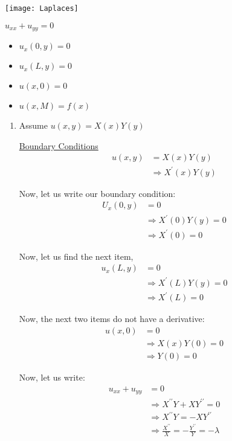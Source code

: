 \begin{center}
  \texttt{[image: Laplaces]}

  $u_{xx} + u_{yy} = 0$
\end{center}
%
\begin{itemize}
  \item $u_x(0, y) = 0$
  \item $u_x(L, y) = 0$
  \item $u(x, 0) = 0$
  \item $u(x, M) = f(x)$
\end{itemize}
%
\begin{enumerate}
  \item Assume $u(x, y) = X(x)Y(y)$

  \underline{Boundary Conditions}
  \begin{align}
    u(x, y) & = X(x) Y(y)\\
    & \Rightarrow X^\prime(x)Y(y)
  \end{align}

  Now, let us write our boundary condition:
  \begin{align}
    U_x(0, y) & = 0\\
    & \Rightarrow X^\prime(0)Y(y) = 0\\
    & \Rightarrow X^\prime(0) = 0
  \end{align}

  Now, let us find the next item,
  \begin{align}
    u_x(L, y) & = 0\\
    & \Rightarrow X^\prime(L)Y(y) = 0\\
    & \Rightarrow X^\prime(L) = 0
  \end{align}

  Now, the next two items do not have a derivative:
  \begin{align}
    u(x, 0) & = 0\\
    & \Rightarrow X(x)Y(0) = 0\\
    & \Rightarrow Y(0) = 0
  \end{align}

  Now, let us write:
  \begin{align}
    u_{xx} + u_{yy} & = 0\\
    & \Rightarrow X^{\prime\prime}Y + XY^{\prime\prime} = 0\\
    & \Rightarrow X^{\prime\prime}Y = - XY^{\prime\prime}\\
    & \Rightarrow \frac{X^{\prime\prime}}{X} = - \frac{Y^{\prime\prime}}{Y}
    = -\lambda
  \end{align}


\end{enumerate}
